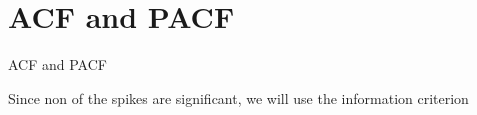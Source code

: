 \documentclass{beamer}
\begin{document}
	\section{ACF and PACF}
	\begin{frame}{ACF and PACF}
		\begin{figure}
			 \hspace{5pt}
		\end{figure}
	
		\begin{exampleblock}{}
			\vspace{5pt}
			Since non of the spikes are significant, we will use the information criterion
			\vspace{5pt}
			
		\end{exampleblock}
	\end{frame}
	
\end{document}
